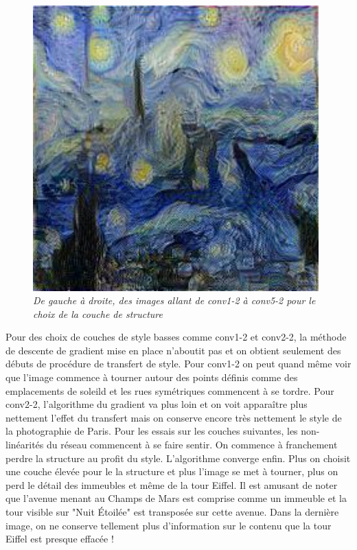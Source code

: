 \documentclass{article}
\begin{document}
\begin{figure}[!htb]
\begin{minipage}{0.2\textwidth}
\end{minipage}%
\begin{minipage}{0.2\textwidth}
\centering
\includegraphics[width=0.98\textwidth]{../Images/transfer/paris_starrynight_c_conv_5_2.jpg}
\end{minipage}
\caption{\textit{De gauche à droite, des images allant de conv1-2 à conv5-2 pour le choix de la couche de structure}}
\label{fig:varier_couche_contenu}
\end{figure}

Pour des choix de couches de style basses comme conv1-2 et conv2-2, la méthode de descente de gradient mise en place n'aboutit pas et on obtient seulement des débuts de procédure de transfert de style. Pour conv1-2 on peut quand même voir que l'image commence à tourner autour des points définis comme des emplacements de soleild et les rues symétriques commencent à se tordre. Pour conv2-2, l'algorithme du gradient va plus loin et on voit apparaître plus nettement l'effet du transfert mais on conserve encore très nettement le style de la photographie de Paris. Pour les essais sur les couches suivantes, les non-linéarités du réseau commencent à se faire sentir. On commence à franchement perdre la structure au profit du style. L'algorithme converge enfin. Plus on choisit une couche élevée pour le la structure et plus l'image se met à tourner, plus on perd le détail des immeubles et même de la tour Eiffel. Il est amusant de noter que l'avenue menant au Champs de Mars est comprise comme un immeuble et la tour visible sur "Nuit Étoilée" est transposée sur cette avenue. Dans la dernière image, on ne conserve tellement plus d'information sur le contenu que la tour Eiffel est presque effacée !
\end{document}
